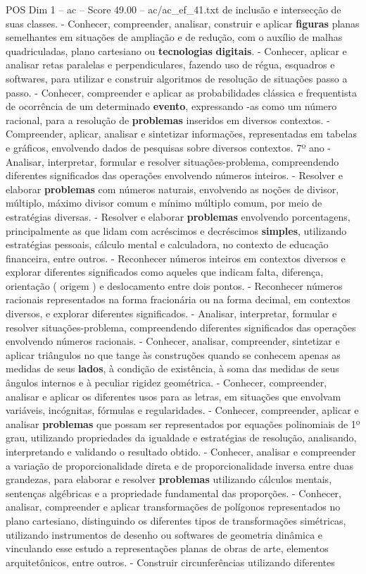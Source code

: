 \begin{textsample}{POS Dim 1 – ac – Score 49.00 – ac/ac\_ef\_41.txt}
de inclusão e intersecção de suas classes. - Conhecer, compreender, analisar, construir e aplicar \textbf{figuras} planas semelhantes em situações de ampliação e de redução, com o auxílio de malhas quadriculadas, plano cartesiano ou \textbf{tecnologias} \textbf{digitais}. - Conhecer, aplicar e analisar retas paralelas e perpendiculares, fazendo uso de régua, esquadros e softwares, para utilizar e construir algoritmos de resolução de situações passo a passo. - Conhecer, compreender e aplicar as probabilidades clássica e frequentista de ocorrência de um determinado \textbf{evento}, expressando -as como um número racional, para a resolução de \textbf{problemas} inseridos em diversos contextos. - Compreender, aplicar, analisar e sintetizar informações, representadas em tabelas e gráficos, envolvendo dados de pesquisas sobre diversos contextos. 7º ano - Analisar, interpretar, formular e resolver situações-problema, compreendendo diferentes significados das operações envolvendo números inteiros. - Resolver e elaborar \textbf{problemas} com números naturais, envolvendo as noções de divisor, múltiplo, máximo divisor comum e mínimo múltiplo comum, por meio de estratégias diversas. - Resolver e elaborar \textbf{problemas} envolvendo porcentagens, principalmente as que lidam com acréscimos e decréscimos \textbf{simples}, utilizando estratégias pessoais, cálculo mental e calculadora, no contexto de educação financeira, entre outros. - Reconhecer números inteiros em contextos diversos e explorar diferentes significados como aqueles que indicam falta, diferença, orientação ( origem ) e deslocamento entre dois pontos. - Reconhecer números racionais representados na forma fracionária ou na forma decimal, em contextos diversos, e explorar diferentes significados. - Analisar, interpretar, formular e resolver situações-problema, compreendendo diferentes significados das operações envolvendo números racionais. - Conhecer, analisar, compreender, sintetizar e aplicar triângulos no que tange às construções quando se conhecem apenas as medidas de seus \textbf{lados}, à condição de existência, à soma das medidas de seus ângulos internos e à peculiar rigidez geométrica. - Conhecer, compreender, analisar e aplicar os diferentes usos para as letras, em situações que envolvam variáveis, incógnitas, fórmulas e regularidades. - Conhecer, compreender, aplicar e analisar \textbf{problemas} que possam ser representados por equações polinomiais de 1º grau, utilizando propriedades da igualdade e estratégias de resolução, analisando, interpretando e validando o resultado obtido. - Conhecer, analisar e compreender a variação de proporcionalidade direta e de proporcionalidade inversa entre duas grandezas, para elaborar e resolver \textbf{problemas} utilizando cálculos mentais, sentenças algébricas e a propriedade fundamental das proporções. - Conhecer, analisar, compreender e aplicar transformações de polígonos representados no plano cartesiano, distinguindo os diferentes tipos de transformações simétricas, utilizando instrumentos de desenho ou softwares de geometria dinâmica e vinculando esse estudo a representações planas de obras de arte, elementos arquitetônicos, entre outros. - Construir circunferências utilizando diferentes 
\end{textsample}
